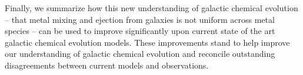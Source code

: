 Finally, we summarize how this new understanding of galactic chemical evolution -- that metal mixing and ejection from galaxies is not uniform across metal species -- can be used to improve significantly upon current state of the art galactic chemical evolution models. These improvements stand to help improve our understanding of galactic chemical evolution and reconcile outstanding disagreements between current models and observations.
